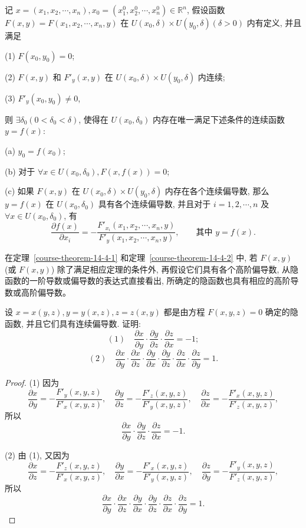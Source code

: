 \documentclass[12pt,fontset=fandol]{ctexart}
\begin{document}
\begin{theorem}[隐函数存在定理]\label{course-theorem-14-4-2}\quad 记 $x=(x_1,x_2,\cdots,x_n),x_0=(x_1^0,x_2^0,\cdots,x_n^0)\in\mathbb R^n$, 假设函数 $F(x,y)=F(x_1,x_2,\cdots,x_n,y)$ 在 $U(x_0,\delta)\times U(y_0,\delta)(\delta>0)$ 内有定义, 并且满足

(1) $F(x_0,y_0)=0$;

(2) $F(x,y)$ 和 $F'_y(x,y)$ 在 $U(x_0,\delta)\times U(y_0,\delta)$ 内连续;

(3) $F'_y(x_0,y_0)\ne0$,

则 $\exists\delta_0(0<\delta_0<\delta)$, 使得在 $U(x_0,\delta_0)$ 内存在唯一满足下述条件的连续函数 $y=f(x)$:

(a) $y_0=f(x_0)$;

(b) 对于 $\forall x\in U(x_0,\delta_0),F(x,f(x))=0$;

(c) 如果 $F(x,y)$ 在 $U(x_0,\delta)\times U(y_0,\delta)$ 内存在各个连续偏导数, 那么 $y=f(x)$ 在 $U(x_0,\delta_0)$ 具有各个连续偏导数, 并且对于 $i=1,2,\cdots,n$ 及 $\forall x\in U(x_0,\delta_0)$, 有
\[
  \frac{\partial f(x)}{\partial x_i}
  =-\frac{F'_{x_i}(x_1,x_2,\cdots,x_n,y)}
  {F'_y(x_1,x_2,\cdots,x_n,y)},\qquad
  \text{其中 }y=f(x).
\]

\end{theorem}
\begin{remark}\quad 在定理~\ref{course-theorem-14-4-1}  和定理~\ref{course-theorem-14-4-2}  中, 若 $F(x,y)$ (或 $F(x,y)$) 除了满足相应定理的条件外, 再假设它们具有各个高阶偏导数, 从隐函数的一阶导数或偏导数的表达式直接看出, 所确定的隐函数也具有相应的高阶导数或高阶偏导数。

\end{remark}
\begin{example}\label{course-example-14-4-1}\quad 设 $x=x(y,z),y=y(x,z),z=z(x,y)$ 都是由方程 $F(x,y,z)=0$ 确定的隐函数, 并且它们具有连续偏导数. 证明:
\[
  (1)\quad \frac{\partial x}{\partial y}\cdot
  \frac{\partial y}{\partial z}\cdot
  \frac{\partial z}{\partial x}=-1;
\]
\[
  (2)\quad \frac{\partial x}{\partial y}\cdot
  \frac{\partial x}{\partial z}\cdot
  \frac{\partial y}{\partial x}\cdot
  \frac{\partial y}{\partial z}\cdot
  \frac{\partial z}{\partial x}\cdot
  \frac{\partial z}{\partial y}=1.
\]

\end{example}
\begin{proof}\quad (1) 因为
\[
  \frac{\partial x}{\partial y}=-\frac{F'_y(x,y,z)}{F'_x(x,y,z)},\quad
  \frac{\partial y}{\partial z}=-\frac{F'_z(x,y,z)}{F'_y(x,y,z)},\quad
  \frac{\partial z}{\partial x}=-\frac{F'_x(x,y,z)}{F'_z(x,y,z)},
\]
所以
\[
  \frac{\partial x}{\partial y}\cdot
  \frac{\partial y}{\partial z}\cdot
  \frac{\partial z}{\partial x}=-1.
\]

(2) 由 (1), 又因为
\[
  \frac{\partial x}{\partial z}=-\frac{F'_z(x,y,z)}{F'_x(x,y,z)},\quad
  \frac{\partial y}{\partial x}=-\frac{F'_x(x,y,z)}{F'_y(x,y,z)},\quad
  \frac{\partial z}{\partial y}=-\frac{F'_y(x,y,z)}{F'_z(x,y,z)},
\]
所以
\[
  \frac{\partial x}{\partial y}\cdot
  \frac{\partial x}{\partial z}\cdot
  \frac{\partial y}{\partial x}\cdot
  \frac{\partial y}{\partial z}\cdot
  \frac{\partial z}{\partial x}\cdot
  \frac{\partial z}{\partial y}=1.
\]

\end{proof}
\end{document}
